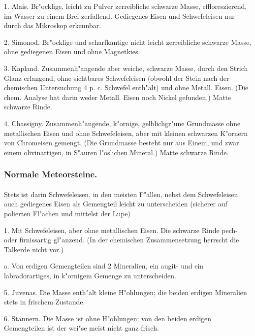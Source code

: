 \documentclass[a4paper, 11pt, oneside, polutonikogreek, german]{article}
\begin{document}
1. Alais. Br"ocklige, leicht zu Pulver zerreibliche schwarze Masse, effloreszierend, im Wasser zu einem Brei zerfallend. Gediegenes Eisen und Schwefeleisen nur durch das Mikroskop erkennbar.

2. Simonod. Br"ocklige und scharfkantige nicht leicht zerreibliche schwarze Masse, ohne gediegenen Eisen und ohne Magnetkies.

3. Kapland. Zusammenh"angende aber weiche, schwarze Masse, durch den Strich Glanz erlangend, ohne sichtbares Schwefeleisen (obwohl der Stein nach der chemischen Untersuchung 4 p. c. Schwefel enth"alt) und ohne Metall. Eisen. (Die chem. Analyse hat darin weder Metall. Eisen noch Nickel gefunden.) Matte schwarze Rinde.

4. Chassigny. Zusammenh"angende, k"ornige, gelblichgr"une Grundmasse ohne metallischen Eisen und ohne Schwefeleisen, aber mit kleinen schwarzen K"ornern von Chromeisen gemengt. (Die Grundmasse besteht nur aus Einem, und zwar einem olivinartigen, in S"auren l"oslichen Mineral.) Matte schwarze Rinde.
\subsubsection{Normale Meteorsteine.}
\paragraph{}
Stets ist darin Schwefeleisen, in den meisten F"allen, nebst dem Schwefeleisen auch gediegenes Eisen als Gemengteil leicht zu unterscheiden (sicherer auf polierten Fl"achen und mittelst der Lupe)

\vspace{2ex}

1. Mit Schwefeleisen, aber ohne metallischen Eisen. Die schwarze Rinde pech- oder firnissartig gl"anzend. (In der chemischen Zusammensetzung herrscht die Talkerde nicht vor.)

\vspace{2ex}

\hspace*{10mm}a. Von erdigen Gemengteilen sind 2 Mineralien, ein augit- und ein labradorartiges, in k"ornigem Gemenge zu unterscheiden.

\hspace*{15mm}5. Juvenas. Die Masse enth"alt kleine H"ohlungen; die beiden erdigen Mineralien stets in frischem Zustande.

\hspace*{15mm}6. Stannern. Die Masse ist ohne H"ohlungen; von den beiden erdigen Gemengteilen ist der wei"se meist nicht ganz frisch.
\end{document}
